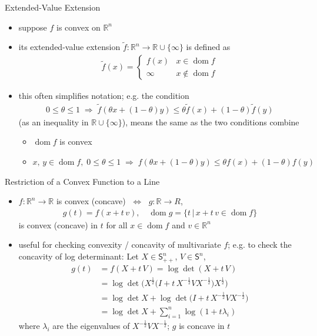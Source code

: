 \documentclass[10pt]{beamer}
\newcommand{\ds}{\displaystyle}
\newcommand{\ie}{\;\Longrightarrow\;}
\newcommand{\ifff}{\;\Longleftrightarrow\;}
\DeclareMathOperator*{\dom}{dom}
\theoremstyle{definition}
\begin{document}
\begin{frame}{Extended-Value Extension}
  \begin{itemize}
    \item suppose $f$ is convex on $\mathbb{R}^n$
    \item its extended-value extension $\ds\widetilde{f}: \mathbb{R}^n\to\mathbb{R}\cup\{\infty\}$ is defined as
      \begin{align*}
        \widetilde{f}(x) = \begin{cases}f(x) & x\in\dom f \\ \infty & x\not\in\dom f\end{cases} 
      \end{align*}
    \item this often simplifies notation; e.g. the condition 
      \begin{align*}
        0\leqslant\theta\leqslant 1\ie\widetilde{f}(\theta x + (1 - \theta) y)\leqslant\theta\widetilde{f}(x) + (1 - \theta)\widetilde{f}(y)
      \end{align*}
      (as an inequality in $\mathbb{R}\cup\{\infty\}$), means the same as the two conditions combine
      \begin{itemize}
        \item $\dom f$ is convex
        \item $x,\,y\in\dom f,\;0\leqslant\theta\leqslant 1 \ie f(\theta x + (1 - \theta)y)\leqslant\theta f(x) + (1 - \theta) f(y)$
      \end{itemize}
  \end{itemize}
\end{frame}

\begin{frame}{Restriction of a Convex Function to a Line}
  \begin{itemize}
    \item $f:\mathbb{R}^n\to\mathbb{R}$ is convex (concave) $\ifff$ $g:\mathbb{R}\to R$, 
      \begin{align*}
        g(t) = f(x + t\,v), \quad\dom g = \{t\,|\, x+t\,v\in\dom f\}  
      \end{align*}
      is convex (concave) in $t$ for all $x\in\dom f$ and $v\in\mathbb{R}^n$
    \item useful for checking convexity / concavity of multivariate $f$; e.g. to check the concavity of log determinant: Let $X\in\mathsf{S}^n_{++}$, $V\in\mathsf{S}^n$,
      \begin{align*} 
        g(t) &= f(X + t\,V) = \log\det(X + t\,V) \\
             &= \log\det\big(X^{\frac{1}{2}}\big(I + t\,X^{-\frac{1}{2}}VX^{-\frac{1}{2}}\big)X^{\frac{1}{2}}\big) \\
             &= \log\det X + \log\det\big(I + t\,X^{-\frac{1}{2}}VX^{-\frac{1}{2}}\big) \\
             &= \log\det X + \sum_{i=1}^n\log(1 + t\lambda_i) 
           \end{align*}\vspace{-3em}
      where $\lambda_i$ are the eigenvalues of $\ds X^{-\frac{1}{2}}VX^{-\frac{1}{2}}$; $g$ is concave in $t$
  \end{itemize}
\end{frame}
\end{document}
